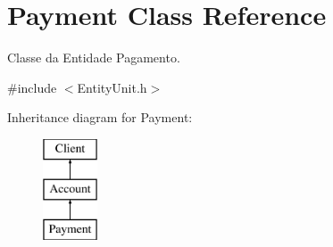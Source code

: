 \hypertarget{classPayment}{\section{Payment Class Reference}
\label{classPayment}
}


Classe da Entidade Pagamento.  




{\ttfamily \#include $<$Entity\-Unit.\-h$>$}

Inheritance diagram for Payment\-:\begin{figure}[H]
\begin{center}
\leavevmode
\includegraphics[height=3.000000cm]{classPayment}
\end{center}
\end{figure}
